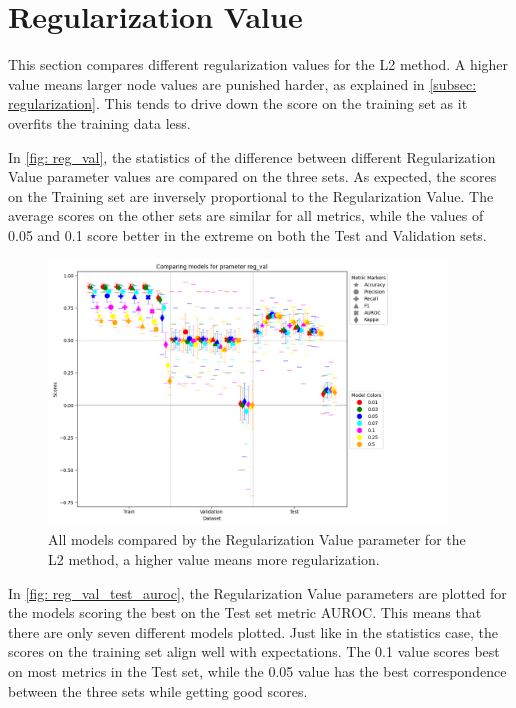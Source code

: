 \section{Regularization Value}
This section compares different regularization values for the L2 method. A higher value means larger node values are punished harder, as explained in \autoref{subsec: regularization}. This tends to drive down the score on the training set as it overfits the training data less.

In \autoref{fig: reg_val}, the statistics of the difference between different Regularization Value parameter values are compared on the three sets. As expected, the scores on the Training set are inversely proportional to the Regularization Value. The average scores on the other sets are similar for all metrics, while the values of 0.05 and 0.1 score better in the extreme on both the Test and Validation sets.

\begin{figure}[H]
    \centering
    \includegraphics[width=400px]{Figures/results/reg_val/reg_val.png}
    \caption{All models compared by the Regularization Value parameter for the L2 method, a higher value means more regularization.}
    \label{fig: reg_val}
\end{figure}

In \autoref{fig: reg_val_test_auroc}, the Regularization Value parameters are plotted for the models scoring the best on the Test set metric AUROC. This means that there are only seven different models plotted. Just like in the statistics case, the scores on the training set align well with expectations. The 0.1 value scores best on most metrics in the Test set, while the 0.05 value has the best correspondence between the three sets while getting good scores.

